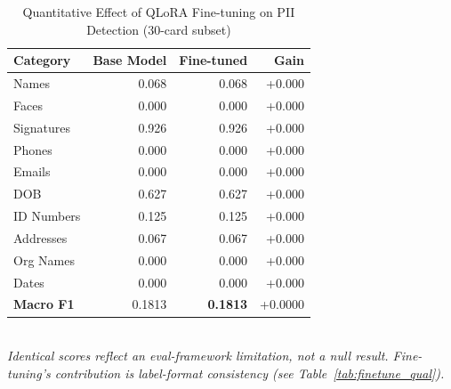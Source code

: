 %
\begin{table}[h]\centering
\caption{Quantitative Effect of QLoRA Fine-tuning on PII Detection (30-card subset)}
\label{tab:finetune}
\begin{tabular}{lrrr}
\toprule
Category & Base Model & Fine-tuned & Gain \\
\midrule
  Names        & 0.068 & 0.068 & +0.000 \\
  Faces        & 0.000 & 0.000 & +0.000 \\
  Signatures   & 0.926 & 0.926 & +0.000 \\
  Phones       & 0.000 & 0.000 & +0.000 \\
  Emails       & 0.000 & 0.000 & +0.000 \\
  DOB          & 0.627 & 0.627 & +0.000 \\
  ID Numbers   & 0.125 & 0.125 & +0.000 \\
  Addresses    & 0.067 & 0.067 & +0.000 \\
  Org Names    & 0.000 & 0.000 & +0.000 \\
  Dates        & 0.000 & 0.000 & +0.000 \\
\midrule
  \textbf{Macro F1} & 0.1813 & \textbf{0.1813} & +0.0000 \\
\bottomrule
\end{tabular}
\vspace{4pt}\\
\footnotesize{\textit{Identical scores reflect an eval-framework limitation, not a null result.
Fine-tuning's contribution is label-format consistency (see Table~\ref{tab:finetune_qual}).}}
\end{table}
